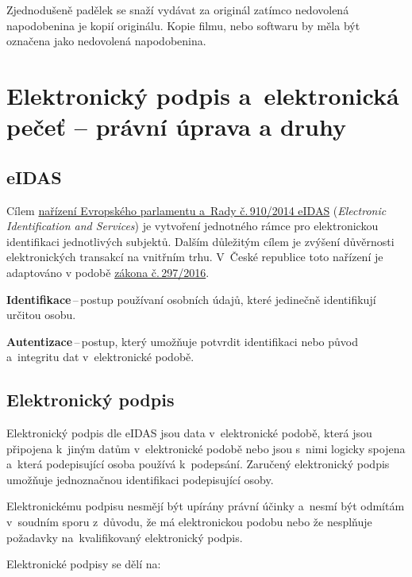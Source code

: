 Zjednodušeně padělek se snaží vydávat za originál zatímco nedovolená napodobenina je kopií originálu. Kopie filmu, nebo softwaru by měla být označena jako nedovolená napodobenina.






\clearpage
\section[Elektronický podpis a~elektronická pečeť -- právní úprava a~druhy]{Elektronický podpis a~elektronická pečeť -- \newline právní úprava a druhy}

\subsection{eIDAS}

Cílem \href{https://eur-lex.europa.eu/legal-content/CS/TXT/?uri=CELEX\%3A32014R0910}{nařízení Evropského parlamentu a~Rady č.\,910/2014 eIDAS} (\emph{Electronic Identification and Services}) je vytvoření jednotného rámce pro elektronickou identifikaci jednotlivých subjektů. Dalším důležitým cílem je zvýšení důvěrnosti elektronických transakcí na vnitřním trhu. V~České republice toto nařízení je adaptováno v podobě \href{https://www.zakonyprolidi.cz/cs/2016-297}{zákona č.\,297/2016}.

\textbf{Identifikace}\,--\,postup používaní osobních údajů, které jedinečně identifikují určitou osobu.

\textbf{Autentizace}\,--\,postup, který umožňuje potvrdit identifikaci nebo původ a~integritu dat v~elektronické podobě.

\subsection{Elektronický podpis}

Elektronický podpis dle eIDAS jsou data v~elektronické podobě, která jsou připojena k~jiným datům v~elektronické podobě nebo jsou s~nimi logicky spojena a~která podepisující osoba používá k~podepsání. Zaručený elektronický podpis umožňuje jednoznačnou identifikaci podepisující osoby. 

Elektronickému podpisu nesmějí být upírány právní účinky a~nesmí být odmítám v~soudním sporu z~důvodu, že má elektronickou podobu nebo že nesplňuje požadavky na~kvalifikovaný elektronický podpis.

Elektronické podpisy se dělí na:

